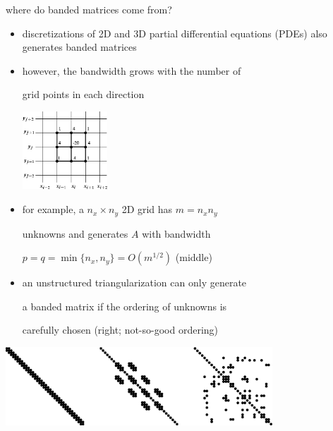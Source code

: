 \documentclass[10pt,
               svgnames,
               hyperref={colorlinks,citecolor=DeepPink4,linkcolor=FireBrick,urlcolor=Maroon},
               usepdftitle=false]{beamer}
\begin{document}
\begin{frame}{where do banded matrices come from?}

\begin{itemize}
\item discretizations of 2D and 3D partial differential equations (PDEs) also generates banded matrices
\item however, the \alert{bandwidth} \alert{grows} with the number of

grid points in each direction

\vspace{-10mm}
\hfill \includegraphics[width=0.25\textwidth]{images/stencil9.png}

\vspace{-18mm}
\item for example, a $n_x \times n_y$ 2D grid has $m=n_x n_y$

unknowns and generates $A$ with bandwidth

$p=q=\min\{n_x,n_y\} = O(m^{1/2})$ (middle)

\item an unstructured triangularization can only generate

a banded matrix if the ordering of unknowns is

carefully chosen (right; not-so-good ordering)
\end{itemize}

\begin{center}
\includegraphics[width=0.75\textwidth]{images/spythree.png}
\end{center}
\end{frame}
\end{document}
